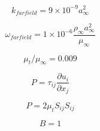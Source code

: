 

\begin{equation}
k_{farfield} = 9 \times 10^{-9} a_{\infty}^2
\end{equation}

\begin{equation}
\omega_{farfield} = 1 \times 10^{-6} \frac{\rho_{\infty}a_{\infty}^2}{\mu_{\infty}} 
\end{equation}

\begin{equation}
\mu_t/\mu_{\infty} = 0.009
\end{equation}

\begin{equation}
P = \tau_{ij}\frac{\partial u_i}{\partial x_j}
\end{equation}

\begin{equation}
P = 2 \mu_t S_{ij}S_{ij}
\end{equation}

\begin{equation}
B=1
\end{equation}


